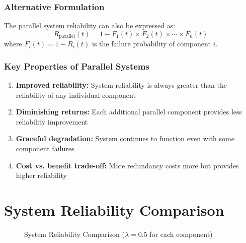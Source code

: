 \documentclass[twoside]{book}
\begin{document}
\subsubsection{Alternative Formulation}
The parallel system reliability can also be expressed as:
\begin{equation}
R_{\text{parallel}}(t) = 1 - F_1(t) \times F_2(t) \times \cdots \times F_n(t)
\end{equation}
where $F_i(t) = 1 - R_i(t)$ is the failure probability of component $i$.

\subsubsection{Key Properties of Parallel Systems}
\begin{enumerate}
    \item \textbf{Improved reliability:} System reliability is always greater than the reliability of any individual component
    \item \textbf{Diminishing returns:} Each additional parallel component provides less reliability improvement
    \item \textbf{Graceful degradation:} System continues to function even with some component failures
    \item \textbf{Cost vs. benefit trade-off:} More redundancy costs more but provides higher reliability
\end{enumerate}

\section{System Reliability Comparison}

\begin{figure}[H]
\centering
{}
\caption{System Reliability Comparison ($\lambda = 0.5$ for each component)}
\end{figure}
\end{document}

